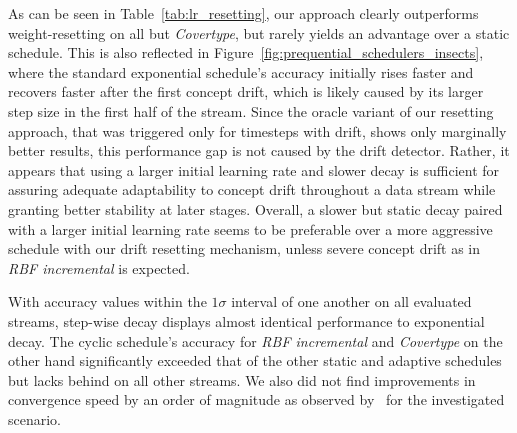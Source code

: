 \documentclass[runningheads]{llncs}
\begin{document}
As can be seen in Table~\ref{tab:lr_resetting}, our approach clearly outperforms weight-resetting on all but \textit{Covertype}, but rarely yields an advantage over a static schedule.
This is also reflected in Figure~\ref{fig:prequential_schedulers_insects}, where the standard exponential schedule's accuracy initially rises faster and recovers faster after the first concept drift, which is likely caused by its larger step size in the first half of the stream.
Since the oracle variant of our resetting approach, that was triggered only for timesteps with drift, shows only marginally better results, this performance gap is not caused by the drift detector.
Rather, it appears that using a larger initial learning rate and slower decay is sufficient for assuring adequate adaptability to concept drift throughout a data stream while granting better stability at later stages.
Overall, a slower but static decay paired with a larger initial learning rate seems to be preferable over a more aggressive schedule with our drift resetting mechanism, unless severe concept drift as in \textit{RBF incremental} is expected.

With accuracy values within the $1\sigma$ interval of one another on all evaluated streams, step-wise decay displays almost identical performance to exponential decay.
The cyclic schedule's accuracy for \textit{RBF incremental} and \textit{Covertype} on the other hand significantly exceeded that of the other static and adaptive schedules but lacks behind on all other streams.
We also did not find improvements in convergence speed by an order of magnitude as observed by~\cite{smithSuperConvergenceVeryFast2018a} for the investigated scenario.
\end{document}

